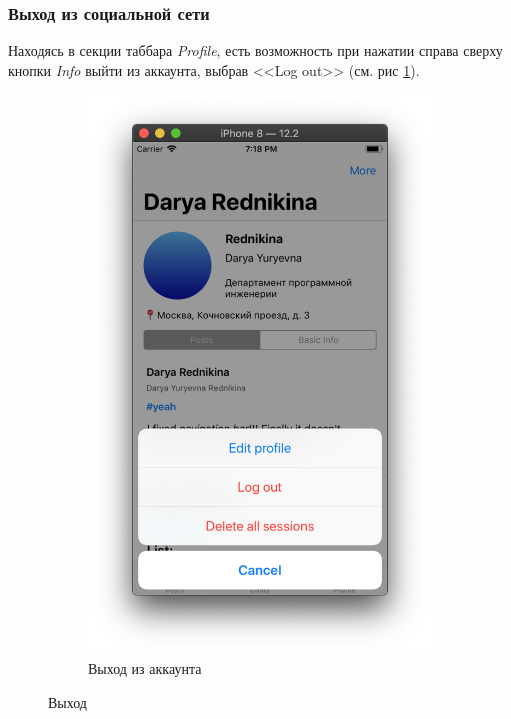 \documentclass[a4paper,12pt]{article}
\begin{document}
	\subsubsection{Выход из социальной сети}
	Находясь в секции таббара \textit{Profile}, есть возможность при нажатии справа сверху кнопки \textit{Info} выйти из аккаунта, выбрав <<Log out>> (см. рис \ref{pic: logout}).
	\begin{figure}[h!]
		\centering
		\begin{subfigure}[b]{0.3\linewidth}
			\includegraphics[width=\linewidth]{../includes/pmi/profile_functions.png}
			\caption{\label{pic: logout}Выход из аккаунта}
		\end{subfigure}
	\caption{\label{pic: userOp}Выход}
	\end{figure}
	\newpage
\end{document}
